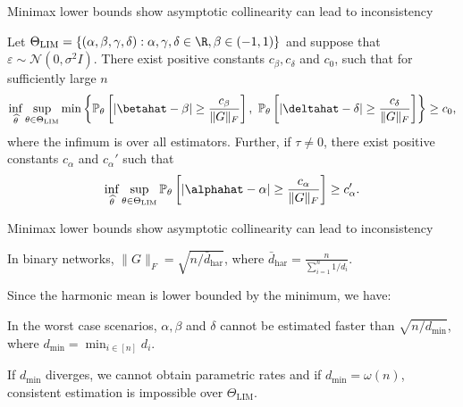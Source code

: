 \documentclass[aspectratio=169]{beamer}
\theoremstyle{remark}
\begin{document}
\begin{frame}{Minimax lower bounds show asymptotic collinearity can lead to inconsistency}
    
    \begin{theorem}
        Let $\Theta_\mathrm{LIM}= \left\{ (\alpha,\beta,\gamma,\delta) : \alpha,\gamma,\delta \in \R, \beta \in (-1,1) \right\}$ and suppose that $\varepsilon \sim \mathcal N(0, \sigma^2 I)$. There exist positive constants $c_\beta,c_\delta$ and $c_0$, such that for sufficiently large $n$
        \begin{equation*} \label{eq:minimax:betadelta}
            \inf_{\widehat{\theta}} \sup_{\theta \in \Theta_\mathrm{LIM}}
            \min\left\{
            \mathbb{P}_{\theta}\left[
                \left| \betahat - \beta \right| \ge \frac{c_\beta}{\| G \|_F} \right] ,
            ~
            \mathbb{P}_{\theta}\left[
                \left| \deltahat - \delta \right| \ge \frac{c_\delta}{\| G \|_F} \right]
            \right\} 
            \ge c_0 ,
        \end{equation*}
        where the infimum is over all estimators. Further, if $\tau \neq 0$, there exist positive constants $c_\alpha$ and $c_\alpha'$ such that
        \begin{equation*}
            \inf_{\widehat{\theta}} \sup_{\theta \in \Theta_\mathrm{LIM}}
            \mathbb{P}_{\theta}\left[
                \left| \alphahat - \alpha \right| \ge \frac{c_\alpha}{\| G \|_F} \right]
            \ge c_\alpha' .
        \end{equation*}
    \end{theorem}
\end{frame}


\begin{frame}{Minimax lower bounds show asymptotic collinearity can lead to inconsistency}
    
    In binary networks, $\| G \|_F = \sqrt{n/\bar{d}_{\text{har}}}$, where $\displaystyle \bar{d}_{\text{har}} = \frac{n}{\sum_{i=1}^n 1/d_i}$.
    
    \vspace{4mm}
    
    Since the harmonic mean is lower bounded by the minimum, we have:
    
    \vspace{2mm}
    
    \begin{theorem}[Intuitive]
        In the worst case scenarios, $\alpha, \beta$ and $\delta$ cannot be estimated faster than $\sqrt{n / d_{\min}}$, where $d_{\min} = \min_{i \in [n]} d_i$.
    \end{theorem}
    
    \vspace{2mm}
    
    If $d_{\min}$ diverges, we cannot obtain parametric rates and if $d_{\min} = \omega(n)$, consistent estimation is impossible over $\Theta_\mathrm{LIM}$.
    
\end{frame}
\end{document}
